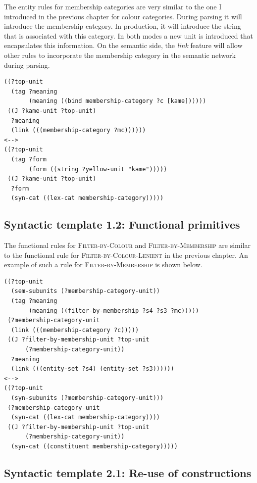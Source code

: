 The entity rules for membership categories are very similar to the one
I introduced in the previous chapter for colour categories. During
parsing it will introduce the membership category. In production, it
will introduce the string that is associated with this category. In
both modes a new unit is introduced that encapsulates this
information. On the semantic side, the \emph{link} feature
will allow
other rules to incorporate the membership category in the semantic
network during parsing.

\footnotesize
{}
\begin{lstlisting}
((?top-unit
  (tag ?meaning 
       (meaning ((bind membership-category ?c [kame])))))
 ((J ?kame-unit ?top-unit)
  ?meaning
  (link (((membership-category ?mc))))))
<-->
((?top-unit
  (tag ?form 
       (form ((string ?yellow-unit "kame")))))
 ((J ?kame-unit ?top-unit)
  ?form
  (syn-cat ((lex-cat membership-category)))))
\end{lstlisting}
\normalsize

\subsection{Syntactic template 1.2: Functional primitives}

The functional rules for \textsc{Filter-by-Colour} and
\textsc{Filter-by-Membership} are similar to the functional rule for 
\textsc{Filter-by-Colour-Lenient} in the previous chapter. An example
of such a rule for \textsc{Filter-by-Membership} is shown below.

\footnotesize
{}
\begin{lstlisting}
((?top-unit
  (sem-subunits (?membership-category-unit)) 
  (tag ?meaning
       (meaning ((filter-by-membership ?s4 ?s3 ?mc)))))
 (?membership-category-unit 
  (link (((membership-category ?c)))))
 ((J ?filter-by-membership-unit ?top-unit 
      (?membership-category-unit))
  ?meaning
  (link (((entity-set ?s4) (entity-set ?s3))))))
<-->
((?top-unit 
  (syn-subunits (?membership-category-unit)))
 (?membership-category-unit 
  (syn-cat ((lex-cat membership-category))))
 ((J ?filter-by-membership-unit ?top-unit 
      (?membership-category-unit))
  (syn-cat ((constituent membership-category)))))
\end{lstlisting}
\normalsize

\subsection{Syntactic template 2.1: Re-use of constructions}

